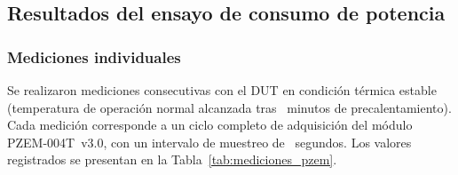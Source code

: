 \subsection{Resultados del ensayo de consumo de potencia}
\label{subsec:resultados_potencia}

\subsubsection{Mediciones individuales}

Se realizaron  mediciones consecutivas
con el DUT en condición térmica estable
(temperatura de operación normal alcanzada tras
~minutos de precalentamiento).
Cada medición corresponde a un ciclo completo de adquisición
del módulo PZEM-004T~v3.0, con un intervalo de muestreo de
~segundos.
Los valores registrados se presentan en la
Tabla~\ref{tab:mediciones_pzem}.

